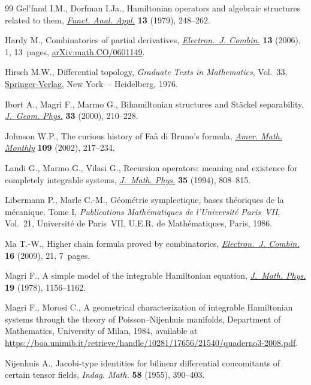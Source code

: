 \documentclass[pdftex]{sigma}%
\numberwithin{equation}{section}
\begin{document}
\begin{thebibliography}{99}
Gel'fand I.M., Dorfman I.Ja., Hamiltonian operators and algebraic structures
 related to them, \href{https://doi.org/10.1007/BF01078363}{\textit{Funct. Anal. Appl.}} \textbf{13} (1979), 248--262.

Hardy M., Combinatorics of partial derivatives, \href{https://doi.org/10.37236/1027}{\textit{Electron.~J. Combin.}}
 \textbf{13} (2006), 1, 13~pages, \href{https://arxiv.org/abs/math.CO/0601149}{arXiv:math.CO/0601149}.

Hirsch M.W., Differential topology, \textit{Graduate Texts in Mathematics},
 Vol.~33, \href{https://doi.org/10.1007/978-1-4684-9449-5}{Springer-Verlag}, New York~-- Heidelberg, 1976.

Ibort A., Magri F., Marmo G., Bihamiltonian structures and {S}t\"ackel
 separability, \href{https://doi.org/10.1016/S0393-0440(99)00051-0}{\textit{J.~Geom. Phys.}} \textbf{33} (2000), 210--228.

Johnson W.P., The curious history of {F}a\`a di {B}runo's formula,
 \href{https://doi.org/10.2307/2695352}{\textit{Amer. Math. Monthly}} \textbf{109} (2002), 217--234.

Landi G., Marmo G., Vilasi G., Recursion operators: meaning and existence for
 completely integrable systems, \href{https://doi.org/10.1063/1.530613}{\textit{J.~Math. Phys.}} \textbf{35} (1994),
 808--815.

Libermann P., Marle C.-M., G\'eom\'etrie symplectique, bases th\'eoriques de la
 m\'ecanique. {T}ome {I}, \textit{Publications Math\'ematiques de
 l'Universit\'e Paris~VII}, Vol.~21, Universit\'e de Paris~VII, U.E.R. de
 Math\'ematiques, Paris, 1986.

Ma T.-W., Higher chain formula proved by combinatorics, \href{https://doi.org/10.37236/259}{\textit{Electron.~J.
 Combin.}} \textbf{16} (2009), 21, 7~pages.

Magri F., A simple model of the integrable {H}amiltonian equation,
 \href{https://doi.org/10.1063/1.523777}{\textit{J.~Math. Phys.}} \textbf{19} (1978), 1156--1162.

Magri F., Morosi C., A geometrical characterization of integrable {H}amiltonian
 systems through the theory of {P}oisson--{N}ijenhuis manifolds, {D}epartment
 of Mathematics, University of Milan, 1984, available at
 \url{https://boa.unimib.it/retrieve/handle/10281/17656/21540/quaderno3-2008.pdf}.

Nijenhuis A., Jacobi-type identities for bilinear differential concomitants of
 certain tensor fields, \textit{Indag. Math.} \textbf{58} (1955), 390--403.


\end{thebibliography}
\end{document}
